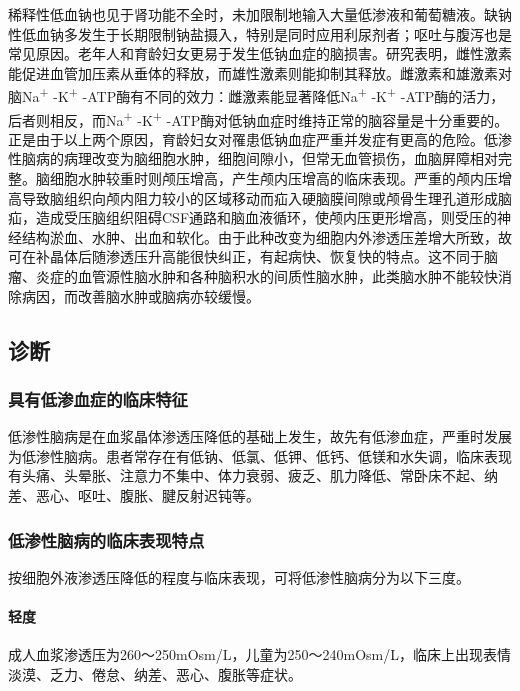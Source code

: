 稀释性低血钠也见于肾功能不全时，未加限制地输入大量低渗液和葡萄糖液。缺钠性低血钠多发生于长期限制钠盐摄入，特别是同时应用利尿剂者；呕吐与腹泻也是常见原因。老年人和育龄妇女更易于发生低钠血症的脑损害。研究表明，雌性激素能促进血管加压素从垂体的释放，而雄性激素则能抑制其释放。雌激素和雄激素对脑Na\textsuperscript{+}
-K\textsuperscript{+}
-ATP酶有不同的效力：雌激素能显著降低Na\textsuperscript{+}
-K\textsuperscript{+} -ATP酶的活力，后者则相反，而Na\textsuperscript{+}
-K\textsuperscript{+}
-ATP酶对低钠血症时维持正常的脑容量是十分重要的。正是由于以上两个原因，育龄妇女对罹患低钠血症严重并发症有更高的危险。低渗性脑病的病理改变为脑细胞水肿，细胞间隙小，但常无血管损伤，血脑屏障相对完整。脑细胞水肿较重时则颅压增高，产生颅内压增高的临床表现。严重的颅内压增高导致脑组织向颅内阻力较小的区域移动而疝入硬脑膜间隙或颅骨生理孔道形成脑疝，造成受压脑组织阻碍CSF通路和脑血液循环，使颅内压更形增高，则受压的神经结构淤血、水肿、出血和软化。由于此种改变为细胞内外渗透压差增大所致，故可在补晶体后随渗透压升高能很快纠正，有起病快、恢复快的特点。这不同于脑瘤、炎症的血管源性脑水肿和各种脑积水的间质性脑水肿，此类脑水肿不能较快消除病因，而改善脑水肿或脑病亦较缓慢。

\subsection{诊断}

\subsubsection{具有低渗血症的临床特征}

低渗性脑病是在血浆晶体渗透压降低的基础上发生，故先有低渗血症，严重时发展为低渗性脑病。患者常存在有低钠、低氯、低钾、低钙、低镁和水失调，临床表现有头痛、头晕胀、注意力不集中、体力衰弱、疲乏、肌力降低、常卧床不起、纳差、恶心、呕吐、腹胀、腱反射迟钝等。

\subsubsection{低渗性脑病的临床表现特点}

按细胞外液渗透压降低的程度与临床表现，可将低渗性脑病分为以下三度。

\paragraph{轻度}

成人血浆渗透压为260～250mOsm/L，儿童为250～240mOsm/L，临床上出现表情淡漠、乏力、倦怠、纳差、恶心、腹胀等症状。


